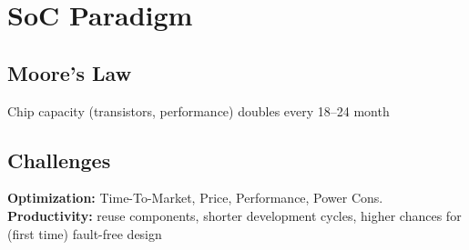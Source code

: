 \section{SoC Paradigm}


\begin{sectionbox}
    \subsection{Moore's Law}
	Chip capacity (transistors, performance) doubles every 18--24 month
\end{sectionbox}

\begin{sectionbox}
    \subsection{Challenges}
	\textbf{Optimization:} Time-To-Market, Price, Performance, Power Cons.\\
	\textbf{Productivity:} reuse components, shorter development cycles, higher chances for (first time) fault-free
design
\end{sectionbox}

